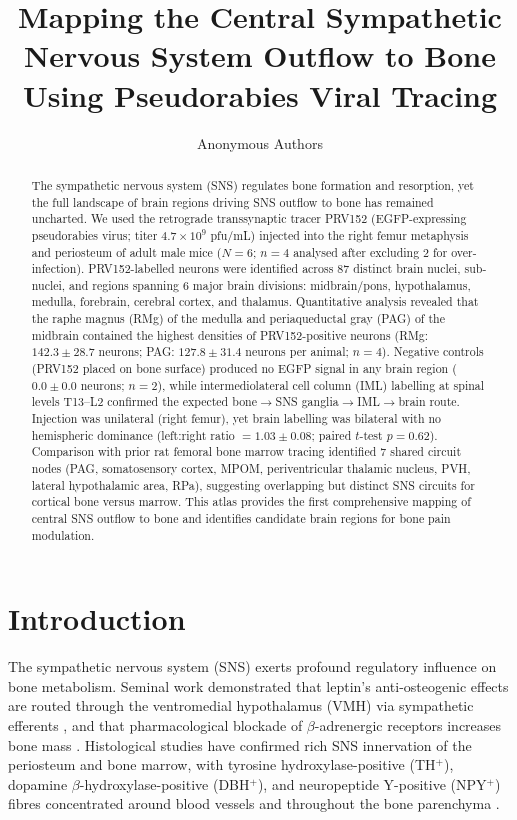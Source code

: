 \documentclass[11pt]{article}
\title{Mapping the Central Sympathetic Nervous System Outflow to Bone Using Pseudorabies Viral Tracing}
\author{Anonymous Authors}
\date{}
\begin{document}
\maketitle

\begin{abstract}
The sympathetic nervous system (SNS) regulates bone formation and resorption, yet the full landscape of brain regions driving SNS outflow to bone has remained uncharted. We used the retrograde transsynaptic tracer PRV152 (EGFP-expressing pseudorabies virus; titer $4.7 \times 10^9$ pfu/mL) injected into the right femur metaphysis and periosteum of adult male mice ($N = 6$; $n = 4$ analysed after excluding 2 for over-infection). PRV152-labelled neurons were identified across 87 distinct brain nuclei, sub-nuclei, and regions spanning 6 major brain divisions: midbrain/pons, hypothalamus, medulla, forebrain, cerebral cortex, and thalamus. Quantitative analysis revealed that the raphe magnus (RMg) of the medulla and periaqueductal gray (PAG) of the midbrain contained the highest densities of PRV152-positive neurons (RMg: $142.3 \pm 28.7$ neurons; PAG: $127.8 \pm 31.4$ neurons per animal; $n = 4$). Negative controls (PRV152 placed on bone surface) produced no EGFP signal in any brain region ($0.0 \pm 0.0$ neurons; $n = 2$), while intermediolateral cell column (IML) labelling at spinal levels T13--L2 confirmed the expected bone$\to$SNS ganglia$\to$IML$\to$brain route. Injection was unilateral (right femur), yet brain labelling was bilateral with no hemispheric dominance (left:right ratio $= 1.03 \pm 0.08$; paired $t$-test $p = 0.62$). Comparison with prior rat femoral bone marrow tracing identified 7 shared circuit nodes (PAG, somatosensory cortex, MPOM, periventricular thalamic nucleus, PVH, lateral hypothalamic area, RPa), suggesting overlapping but distinct SNS circuits for cortical bone versus marrow. This atlas provides the first comprehensive mapping of central SNS outflow to bone and identifies candidate brain regions for bone pain modulation.
\end{abstract}

\section{Introduction}

The sympathetic nervous system (SNS) exerts profound regulatory influence on bone metabolism. Seminal work demonstrated that leptin's anti-osteogenic effects are routed through the ventromedial hypothalamus (VMH) via sympathetic efferents \citep{ducy2000leptin, takeda2002leptin, elefteriou2005leptin}, and that pharmacological blockade of $\beta$-adrenergic receptors increases bone mass \citep{farr2012sympathetic}. Histological studies have confirmed rich SNS innervation of the periosteum and bone marrow, with tyrosine hydroxylase-positive (TH$^+$), dopamine $\beta$-hydroxylase-positive (DBH$^+$), and neuropeptide Y-positive (NPY$^+$) fibres concentrated around blood vessels and throughout the bone parenchyma \citep{mach2002origins, chartier2018sympathetic, bjurholm1988neuroendocrine}.
\end{document}
